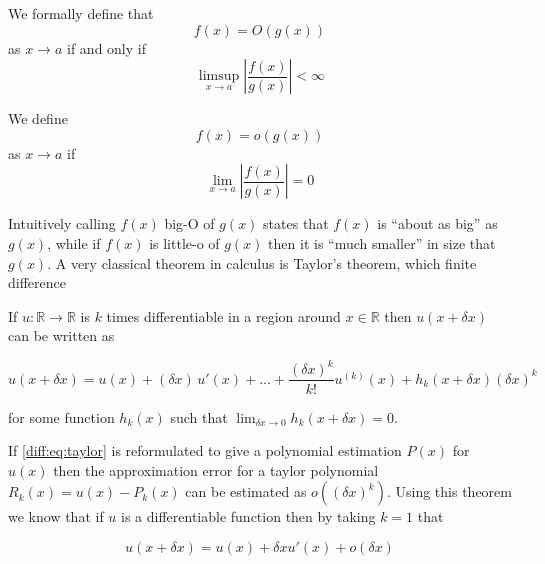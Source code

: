 \documentclass[../main.tex]{subfiles}
\begin{document}
  \begin{definition}[Big O]
    We formally define that
    \begin{equation}
      f(x) = O(g(x))
    \end{equation}
    as $x \to a$ if and only if
    \begin{equation}
      \limsup_{x \to a} \left\vert \frac{f(x)}{g(x)} \right\vert < \infty
    \end{equation}
  \end{definition}

  \begin{definition}[Little O]
    We define
    \begin{equation}
      f(x) = o(g(x))
    \end{equation}
    as $x \to a$ if
    \begin{equation}
      \lim_{x \to a} \left\vert \frac{f(x)}{g(x)} \right\vert = 0
    \end{equation}
  \end{definition}

  Intuitively calling $f(x)$ big-O of $g(x)$ states that $f(x)$ is ``about as big'' as $g(x)$, while if $f(x)$ is little-o of $g(x)$ then it is ``much smaller'' in size that $g(x)$. A very classical theorem in calculus is Taylor's theorem, which finite difference

  \begin{theorem}[Taylor]
    If $u : \mathbb{R} \to \mathbb{R}$ is $k$ times differentiable in a region around $x \in \mathbb{R}$ then $u(x + \delta x)$ can be written as

    \begin{equation} \label{diff:eq:taylor}
      u(x + \delta x) = u(x) + (\delta x) \, u'(x) + ... + \frac{(\delta x)^k}{k!} u^{(k)}(x) + h_k(x + \delta x) (\delta x)^k
    \end{equation}

    for some function $h_k(x)$ such that $\lim_{\delta x \to 0} h_k(x + \delta x) = 0$.
  \end{theorem}

  If \autoref{diff:eq:taylor} is reformulated to give a polynomial estimation $P(x)$ for $u(x)$ then the approximation error for a taylor polynomial $R_k(x) = u(x) - P_k(x)$ can be estimated as $o((\delta x)^k)$. Using this theorem we know that if $u$ is a differentiable function then by taking $k = 1$ that

  \begin{equation}
    u(x + \delta x) = u(x) + \delta x u'(x) + o(\delta x)
  \end{equation}
\end{document}
